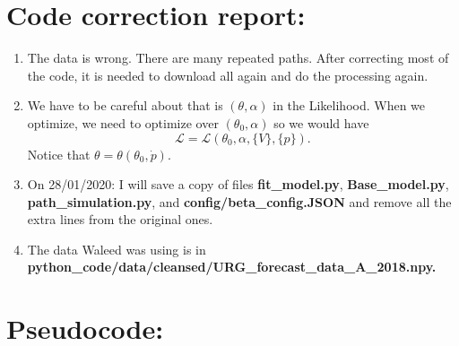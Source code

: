 \documentclass[12pt]{article}
\begin{document}
\section{Code correction report:}

\begin{enumerate}

\item The data is wrong. There are many repeated paths. After correcting most of the code, it is needed to download all again and do the processing again.
\item We have to be careful about that is $(\theta,\alpha)$ in the Likelihood. When we optimize, we need to optimize over $(\theta_0,\alpha)$ so we would have
\begin{equation*}
\mathcal{L}=\mathcal{L}\left(\theta_0,\alpha,\{V\},\{p\}\right).
\end{equation*}
Notice that $\theta=\theta(\theta_0,\dot{p})$.
\item On 28/01/2020: I will save a copy of files \textbf{fit\_model.py}, \textbf{Base\_model.py}, \textbf{path\_simulation.py}, and \textbf{config/beta\_config.JSON} and remove all the extra lines from the original ones.

\item The data Waleed was using is in \textbf{python\_code/data/cleansed/URG\_forecast\_data\_A\_2018.npy.}

\end{enumerate}

\section{Pseudocode:}
\end{document}
